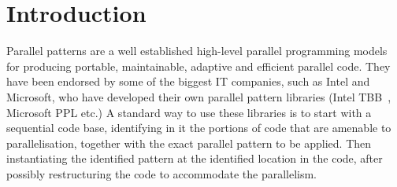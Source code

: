 %

\section{Introduction}

Parallel patterns are a well established high-level parallel programming models for producing portable, maintainable, adaptive and efficient parallel code. They have been endorsed by some of the biggest IT companies, such as Intel and Microsoft, who have developed their own parallel pattern libraries (Intel TBB~\cite{DBLP:reference/parallel/X11pz}, Microsoft PPL etc.) A standard way to use these libraries is to start with a sequential code base, identifying in it the portions of code that are amenable to parallelisation, together with the exact parallel pattern to be applied.  Then instantiating the identified pattern at the identified location in the code, after possibly restructuring the code to accommodate the parallelism. 


